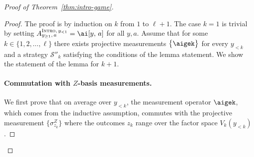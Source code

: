 \documentclass[11pt]{article}
\theoremstyle{definition}
\newcommand{\strategy}{\mathscr{S}}
\newcommand{\typestyle}[1]{\ensuremath{\textsc{#1}}\xspace}
\newcommand{\Intro}{\typestyle{Intro}}
\begin{document}
\begin{proof}[Proof of Theorem~\ref{thm:intro-game}]
  \begin{proof}

    The proof is by induction on $k$ from $1$ to $\ell+1$.
    The case $k=1$ is trivial by setting $A_{y_{\geq 1},\, a}^{\Intro,\, y_{<1}}
    = \ai[y,\, a]$ for all $y,a$.
    Assume that for some $k \in \{1, 2, \ldots, \ell\}$ there exists projective
    measurements $\bigl\{\aigek \bigr\}$ for every $y_{< k}$ and a strategy
    $\strategy''_k$ satisfying the conditions of the lemma statement.
    We show the statement of the lemma for $k+1$.

    \paragraph{Commutation with $Z$-basis measurements.}
    We first prove that on average over $y_{< k}$, the measurement operator
    $\aigek$, which comes from the inductive assumption, commutes with the
    projective measurement $\{\sigma^Z_{z_k}\}$ where the outcomes $z_k$ range
    over the factor space $V_k(y_{<k})$.


\end{proof}
\end{proof}
\end{document}
